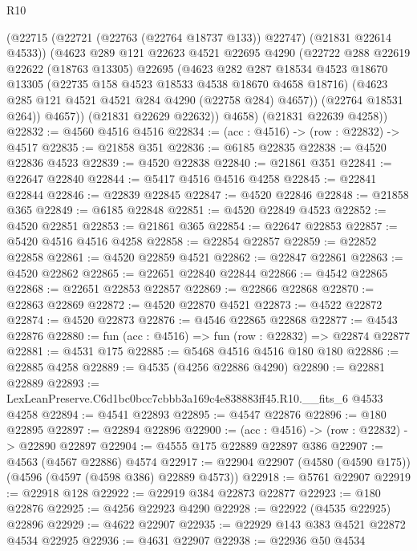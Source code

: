\begin{lexlean}{R10}
\begin{coremodule}
            (@22715 (@22721 (@22763 (@22764 @18737 @133)) @22747) (@21831 @22614 @4533))
            (@4623
              @289
              @121
              @22623
              @4521
              @22695
              @4290
              (@22722
                @288
                @22619
                @22622
                (@18763 @13305)
                @22695
                (@4623
                  @282
                  @287
                  @18534
                  @4523
                  @18670
                  @13305
                  (@22735 @158 @4523 @18533 @4538 @18670 @4658 @18716)
                  (@4623 @285 @121 @4521 @4521 @284 @4290 (@22758 @284) @4657))
                (@22764 @18531 @264))
              @4657))
          (@21831 @22629 @22632))
        @4658)
      (@21831 @22639 @4258))
@22832 := @4560 @4516 @4516
@22834 := (acc : @4516) -> (row : @22832) -> @4517
@22835 := @21858 @351
@22836 := @6185 @22835
@22838 := @4520 @22836 @4523
@22839 := @4520 @22838
@22840 := @21861 @351
@22841 := @22647 @22840
@22844 := @5417 @4516 @4516 @4258
@22845 := @22841 @22844
@22846 := @22839 @22845
@22847 := @4520 @22846
@22848 := @21858 @365
@22849 := @6185 @22848
@22851 := @4520 @22849 @4523
@22852 := @4520 @22851
@22853 := @21861 @365
@22854 := @22647 @22853
@22857 := @5420 @4516 @4516 @4258
@22858 := @22854 @22857
@22859 := @22852 @22858
@22861 := @4520 @22859 @4521
@22862 := @22847 @22861
@22863 := @4520 @22862
@22865 := @22651 @22840 @22844
@22866 := @4542 @22865
@22868 := @22651 @22853 @22857
@22869 := @22866 @22868
@22870 := @22863 @22869
@22872 := @4520 @22870 @4521
@22873 := @4522 @22872
@22874 := @4520 @22873
@22876 := @4546 @22865 @22868
@22877 := @4543 @22876
@22880 := fun (acc : @4516) => fun (row : @22832) => @22874 @22877
@22881 := @4531 @175
@22885 := @5468 @4516 @4516 @180 @180
@22886 := @22885 @4258
@22889 := @4535 (@4256 @22886 @4290)
@22890 := @22881 @22889
@22893 := LexLeanPreserve.C6d1bc0bcc7cbbb3a169c4e838883ff45.R10.__fits_6 @4533 @4258
@22894 := @4541 @22893
@22895 := @4547 @22876
@22896 := @180 @22895
@22897 := @22894 @22896
@22900 := (acc : @4516) -> (row : @22832) -> @22890 @22897
@22904 := @4555 @175 @22889 @22897 @386
@22907 := @4563 (@4567 @22886) @4574
@22917 := @22904 @22907 (@4580 (@4590 @175)) (@4596 (@4597 (@4598 @386) @22889 @4573))
@22918 := @5761 @22907
@22919 := @22918 @128
@22922 := @22919 @384 @22873 @22877
@22923 := @180 @22876
@22925 := @4256 @22923 @4290
@22928 := @22922 (@4535 @22925) @22896
@22929 := @4622 @22907
@22935 := @22929 @143 @383 @4521 @22872 @4534 @22925
@22936 := @4631 @22907
@22938 := @22936 @50 @4534

\end{coremodule}
\end{lexlean}
